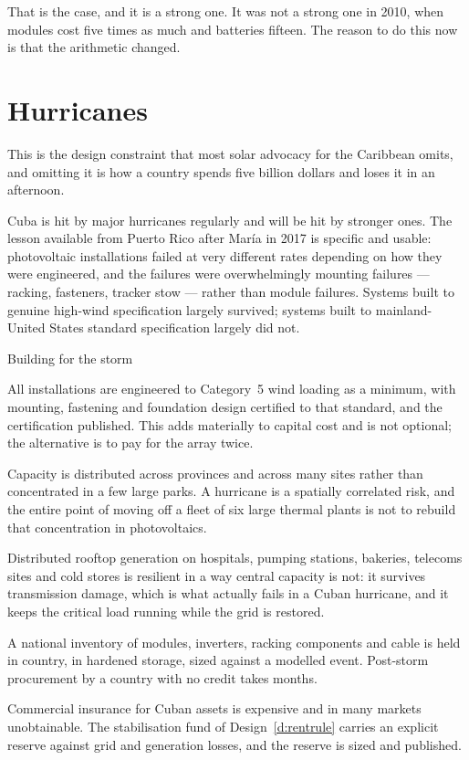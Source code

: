 That is the case, and it is a strong one. It was not a strong one in 2010, when
modules cost five times as much and batteries fifteen. The reason to do this now
is that the arithmetic changed.

\section{Hurricanes}

This is the design constraint that most solar advocacy for the Caribbean omits,
and omitting it is how a country spends five billion dollars and loses it in an
afternoon.

Cuba is hit by major hurricanes regularly and will be hit by stronger ones. The
lesson available from Puerto Rico after Mar\'ia in 2017 is specific and
usable: photovoltaic installations failed at very different rates depending on
how they were engineered, and the failures were overwhelmingly mounting failures
--- racking, fasteners, tracker stow --- rather than module failures. Systems
built to genuine high-wind specification largely survived; systems built to
mainland-United States standard specification largely did not.

\begin{design}{Building for the storm}
\label{d:storm}
\begin{rules}
 All installations are engineered to Category~5 wind
loading as a minimum, with mounting, fastening and foundation design certified
to that standard, and the certification published. This adds materially to
capital cost and is not optional; the alternative is to pay for the array twice.

 Capacity is distributed across provinces and across many
sites rather than concentrated in a few large parks. A hurricane is a spatially
correlated risk, and the entire point of moving off a fleet of six large thermal
plants is not to rebuild that concentration in photovoltaics.

 Distributed rooftop generation on hospitals,
pumping stations, bakeries, telecoms sites and cold stores is resilient in a way
central capacity is not: it survives transmission damage, which is what actually
fails in a Cuban hurricane, and it keeps the critical load running while the grid
is restored.

 A national inventory of modules, inverters,
racking components and cable is held in country, in hardened storage, sized
against a modelled event. Post-storm procurement by a country with no credit
takes months.

 Commercial insurance for Cuban assets is expensive and
in many markets unobtainable. The stabilisation fund of
Design~\ref{d:rentrule} carries an explicit reserve against grid and generation
losses, and the reserve is sized and published.
\end{rules}
\end{design}

